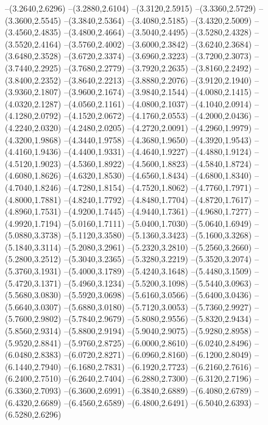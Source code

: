 {	--(3.2640,2.6296)
	--(3.2880,2.6104)
	--(3.3120,2.5915)
	--(3.3360,2.5729)
	--(3.3600,2.5545)
	--(3.3840,2.5364)
	--(3.4080,2.5185)
	--(3.4320,2.5009)
	--(3.4560,2.4835)
	--(3.4800,2.4664)
	--(3.5040,2.4495)
	--(3.5280,2.4328)
	--(3.5520,2.4164)
	--(3.5760,2.4002)
	--(3.6000,2.3842)
	--(3.6240,2.3684)
	--(3.6480,2.3528)
	--(3.6720,2.3374)
	--(3.6960,2.3223)
	--(3.7200,2.3073)
	--(3.7440,2.2925)
	--(3.7680,2.2779)
	--(3.7920,2.2635)
	--(3.8160,2.2492)
	--(3.8400,2.2352)
	--(3.8640,2.2213)
	--(3.8880,2.2076)
	--(3.9120,2.1940)
	--(3.9360,2.1807)
	--(3.9600,2.1674)
	--(3.9840,2.1544)
	--(4.0080,2.1415)
	--(4.0320,2.1287)
	--(4.0560,2.1161)
	--(4.0800,2.1037)
	--(4.1040,2.0914)
	--(4.1280,2.0792)
	--(4.1520,2.0672)
	--(4.1760,2.0553)
	--(4.2000,2.0436)
	--(4.2240,2.0320)
	--(4.2480,2.0205)
	--(4.2720,2.0091)
	--(4.2960,1.9979)
	--(4.3200,1.9868)
	--(4.3440,1.9758)
	--(4.3680,1.9650)
	--(4.3920,1.9543)
	--(4.4160,1.9436)
	--(4.4400,1.9331)
	--(4.4640,1.9227)
	--(4.4880,1.9124)
	--(4.5120,1.9023)
	--(4.5360,1.8922)
	--(4.5600,1.8823)
	--(4.5840,1.8724)
	--(4.6080,1.8626)
	--(4.6320,1.8530)
	--(4.6560,1.8434)
	--(4.6800,1.8340)
	--(4.7040,1.8246)
	--(4.7280,1.8154)
	--(4.7520,1.8062)
	--(4.7760,1.7971)
	--(4.8000,1.7881)
	--(4.8240,1.7792)
	--(4.8480,1.7704)
	--(4.8720,1.7617)
	--(4.8960,1.7531)
	--(4.9200,1.7445)
	--(4.9440,1.7361)
	--(4.9680,1.7277)
	--(4.9920,1.7194)
	--(5.0160,1.7111)
	--(5.0400,1.7030)
	--(5.0640,1.6949)
	--(5.0880,3.3738)
	--(5.1120,3.3580)
	--(5.1360,3.3423)
	--(5.1600,3.3268)
	--(5.1840,3.3114)
	--(5.2080,3.2961)
	--(5.2320,3.2810)
	--(5.2560,3.2660)
	--(5.2800,3.2512)
	--(5.3040,3.2365)
	--(5.3280,3.2219)
	--(5.3520,3.2074)
	--(5.3760,3.1931)
	--(5.4000,3.1789)
	--(5.4240,3.1648)
	--(5.4480,3.1509)
	--(5.4720,3.1371)
	--(5.4960,3.1234)
	--(5.5200,3.1098)
	--(5.5440,3.0963)
	--(5.5680,3.0830)
	--(5.5920,3.0698)
	--(5.6160,3.0566)
	--(5.6400,3.0436)
	--(5.6640,3.0307)
	--(5.6880,3.0180)
	--(5.7120,3.0053)
	--(5.7360,2.9927)
	--(5.7600,2.9802)
	--(5.7840,2.9679)
	--(5.8080,2.9556)
	--(5.8320,2.9434)
	--(5.8560,2.9314)
	--(5.8800,2.9194)
	--(5.9040,2.9075)
	--(5.9280,2.8958)
	--(5.9520,2.8841)
	--(5.9760,2.8725)
	--(6.0000,2.8610)
	--(6.0240,2.8496)
	--(6.0480,2.8383)
	--(6.0720,2.8271)
	--(6.0960,2.8160)
	--(6.1200,2.8049)
	--(6.1440,2.7940)
	--(6.1680,2.7831)
	--(6.1920,2.7723)
	--(6.2160,2.7616)
	--(6.2400,2.7510)
	--(6.2640,2.7404)
	--(6.2880,2.7300)
	--(6.3120,2.7196)
	--(6.3360,2.7093)
	--(6.3600,2.6991)
	--(6.3840,2.6889)
	--(6.4080,2.6789)
	--(6.4320,2.6689)
	--(6.4560,2.6589)
	--(6.4800,2.6491)
	--(6.5040,2.6393)
	--(6.5280,2.6296)
}

